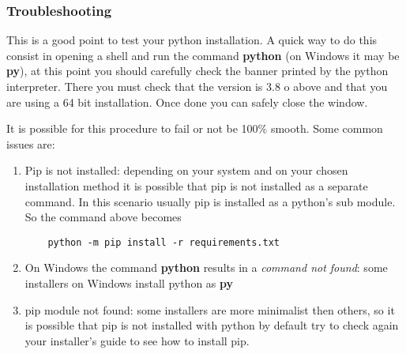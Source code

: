         \subsubsection{Troubleshooting}
            This is a good point to test your python installation.  A quick way to do this consist in opening a shell and run the command \textbf{python} (on Windows it may be \textbf{py}),
            at this point you should carefully check the banner printed by the python interpreter. There you must check that the version is 3.8 o above and that you are 
            using a 64 bit installation. Once done you can safely close the window. 

            It is possible for this procedure to fail or not be 100\% smooth. Some common issues are:
            \begin{enumerate}
                \item Pip is not installed: depending on your system and on your chosen installation method it is possible that pip is not installed as a
                separate command. In this scenario usually pip is installed as a python's sub module. So the command above becomes
               \begin{lstlisting}
    python -m pip install -r requirements.txt
                \end{lstlisting}
                
                \item On Windows the command \textbf{python} results in a \emph{command not found}: some installers on Windows install python as \textbf{py} 
                \item pip module not found: some installers are more minimalist then others, so it is possible that pip is not installed with python by default
                try to check again your installer's guide to see how to install pip.
            \end{enumerate}

